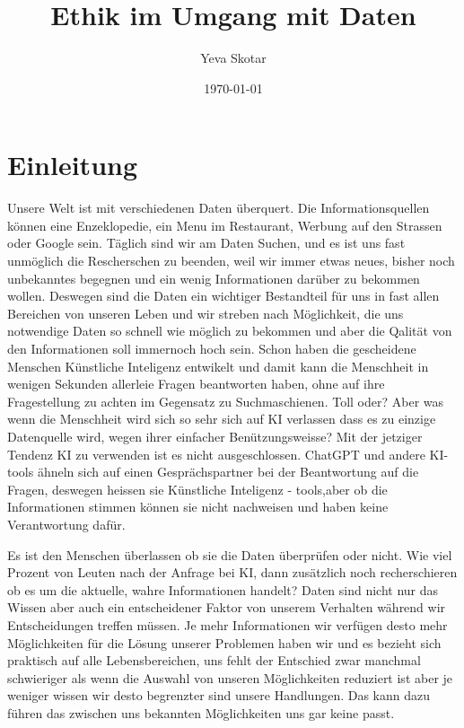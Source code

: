 \documentclass{report}
\title{Ethik im Umgang mit Daten}
\author{Yeva Skotar}
\date{\today}
\begin{document}
\maketitle


\tableofcontents

\chapter{Einleitung}
Unsere Welt ist mit verschiedenen Daten überquert. Die Informationsquellen können eine Enzeklopedie, 
ein Menu im Restaurant, Werbung auf den Strassen oder Google sein. Täglich sind wir am Daten Suchen, 
und es ist uns fast unmöglich die Rescherschen zu beenden, weil wir immer etwas neues, bisher noch unbekanntes 
begegnen und ein wenig Informationen darüber zu bekommen wollen. Deswegen sind die Daten ein wichtiger
Bestandteil für uns in fast allen Bereichen von unseren Leben und wir streben nach Möglichkeit,
die uns notwendige Daten so schnell wie möglich zu bekommen und aber die Qalität von den Informationen
soll immernoch hoch sein. Schon haben die gescheidene Menschen Künstliche Inteligenz entwikelt 
und damit kann die Menschheit in wenigen Sekunden allerleie Fragen beantworten haben, ohne auf ihre
Fragestellung zu achten im Gegensatz zu Suchmaschienen. Toll oder? Aber was wenn die Menschheit wird 
sich so sehr sich auf KI verlassen dass es zu einzige Datenquelle wird, wegen ihrer einfacher
Benützungsweisse? Mit der jetziger Tendenz KI zu verwenden ist es nicht ausgeschlossen.
ChatGPT und andere KI-tools ähneln sich auf einen Gesprächspartner bei der Beantwortung auf die Fragen,
deswegen heissen sie Künstliche Inteligenz - tools,aber ob die Informationen stimmen können sie nicht 
nachweisen und haben keine Verantwortung dafür. 

Es ist den Menschen überlassen ob sie die Daten überprüfen oder nicht. Wie viel Prozent 
von Leuten nach der Anfrage bei KI, dann zusätzlich noch recherschieren ob es um die aktuelle, 
wahre Informationen handelt? Daten sind nicht nur das Wissen aber auch ein entscheidener Faktor von 
unserem Verhalten während wir Entscheidungen treffen müssen. Je mehr Informationen wir verfügen
desto mehr Möglichkeiten für die Lösung unserer Problemen haben wir und es bezieht sich praktisch
auf alle Lebensbereichen, uns fehlt der Entschied zwar manchmal schwieriger als wenn die Auswahl 
von unseren Möglichkeiten reduziert ist aber je weniger wissen wir desto begrenzter sind unsere Handlungen.
Das kann dazu führen das zwischen uns bekannten Möglichkeiten uns gar keine passt. 
\end{document}
